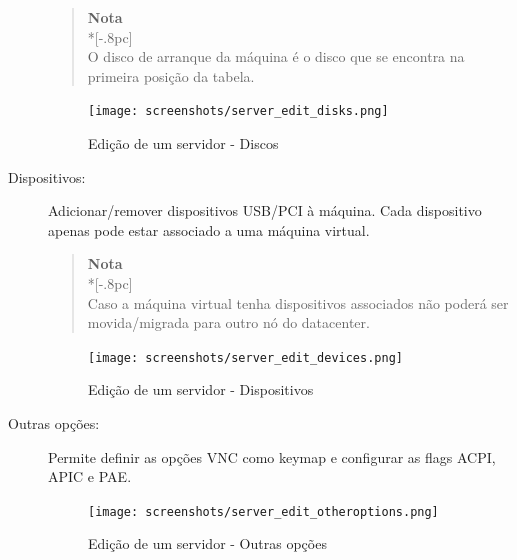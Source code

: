\begin{description}
                \begin{quote}
                    {\large \bf Nota} \\*[-.8pc]
                    \underline{\hspace{6in}} \\
                    O disco de arranque da máquina é o disco que se encontra na primeira posição da tabela.
                \end{quote}
                    
		\begin{figure}[H]
        		\begin{center}
		        \texttt{[image: screenshots/server\_edit\_disks.png]}
        		\caption{Edição de um servidor - Discos}
		        \label{fig:server_edit_disks}
	        	\end{center}
		\end{figure}
    \item[Dispositivos:] Adicionar/remover dispositivos USB/PCI à máquina. Cada dispositivo apenas pode estar associado a uma máquina virtual. 

                \begin{quote}
                    {\large \bf Nota} \\*[-.8pc]
                    \underline{\hspace{6in}} \\
                    Caso a máquina virtual tenha dispositivos associados não poderá ser movida/migrada para outro nó do datacenter.
                \end{quote}
    
		\begin{figure}[H]
        		\begin{center}
		        \texttt{[image: screenshots/server\_edit\_devices.png]}
        		\caption{Edição de um servidor - Dispositivos}
		        \label{fig:server_edit_devices}
	        	\end{center}
		\end{figure}
      
	\item[Outras opções:] Permite definir as opções VNC como keymap e configurar as flags ACPI, APIC e PAE.

		\begin{figure}[H]
        		\begin{center}
		        \texttt{[image: screenshots/server\_edit\_otheroptions.png]}
        		\caption{Edição de um servidor - Outras opções}
	        	\label{fig:server_edit_otheroptions}
	        	\end{center}
		\end{figure}


\end{description}
